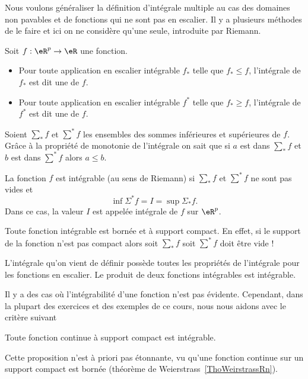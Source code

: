 Nous voulons généraliser la définition d'intégrale multiple au cas des domaines non pavables et de fonctions qui ne sont pas en escalier. Il y a plusieurs méthodes de le faire et ici on ne considère qu'une seule, introduite par Riemann.
\begin{definition} Soit $f: \eR^p\to \eR$ une fonction.
  \begin{itemize}
	  \item Pour toute application en escalier intégrable $f_*$ telle que $f_*\leq f$, l'intégrale de $f_*$ est dit une  de $f$.
	  \item Pour toute application en escalier intégrable $f^*$ telle que $f_*\geq f$, l'intégrale de $f^*$ est dit une  de $f$.
  \end{itemize}
\end{definition}
Soient $\sum_* f$ et  $\sum^* f$ les ensembles des sommes inférieures et supérieures de $f$. Grâce à la propriété de  monotonie de l'intégrale on sait que si $a$ est dans $\sum_* f$ et  $b$ est dans $\sum^* f$ alors $a\leq b$.
\begin{definition}
  La fonction $f$ est intégrable (au sens de Riemann) si $\sum_* f$ et  $\sum^* f$ ne sont pas vides et
\[
\inf \Sigma^* f=I =\sup \Sigma_* f.
\]
Dans ce cas, la valeur $I$ est appelée intégrale de $f$ sur $\eR^p$.
\end{definition}
\begin{remark}
  Toute fonction intégrable est bornée et à support compact. En effet, si le support de la  fonction n'est pas compact alors soit $\sum_* f$ soit $\sum^* f$ doit être vide !
\end{remark}
L'intégrale qu'on vient de définir possède toutes les propriétés de l'intégrale pour les fonctions en escalier. Le produit de deux fonctions intégrables est intégrable.

Il y a des cas où l'intégrabilité d'une fonction n'est pas évidente. Cependant, dans la plupart des exercices et des exemples de ce cours, nous nous aidons avec le critère suivant
\begin{proposition}
  Toute fonction continue à support compact est intégrable.
\end{proposition}
Cette proposition n'est à priori pas étonnante, vu qu'une fonction continue sur un support compact est bornée (théorème de Weierstrass~\ref{ThoWeirstrassRn}).

